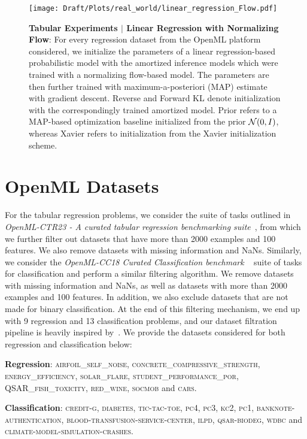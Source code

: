 \begin{figure}
    \centering
    \texttt{[image: Draft/Plots/real\_world/linear\_regression\_Flow.pdf]}
    \caption{\textbf{Tabular Experiments $|$ Linear Regression with Normalizing Flow}: For every regression dataset from the OpenML platform considered, we initialize the parameters of a linear regression-based probabilistic model with the amortized inference models which were trained with a normalizing flow-based model. The parameters are then further trained with maximum-a-posteriori (MAP) estimate with gradient descent. Reverse and Forward KL denote initialization with the correspondingly trained amortized model. Prior refers to a MAP-based optimization baseline initialized from the prior ${\mathcal{N}}(0, I)$, whereas Xavier refers to initialization from the Xavier initialization scheme.}
    \label{fig:regression_linear_flow}
\end{figure}
\section{OpenML Datasets}
\label{appdx:datasets}

For the tabular regression problems, we consider the suite of tasks outlined in \textit{OpenML-CTR23 - A curated tabular regression benchmarking suite}~\citep{fischer2023openmlctr23}, from which we further filter out datasets that have more than 2000 examples and 100 features. We also remove datasets with missing information and NaNs. Similarly, we consider the \textit{OpenML-CC18 Curated Classification benchmark
}~\citep{bischl2019openmlcc18} suite of tasks for classification and perform a similar filtering algorithm. We remove datasets with missing information and NaNs, as well as datasets with more than 2000 examples and 100 features. In addition, we also exclude datasets that are not made for binary classification. At the end of this filtering mechanism, we end up with 9 regression and 13 classification problems, and our dataset filtration pipeline is heavily inspired by~\cite{hollmann2022tabpfn}. We provide the datasets considered for both regression and classification below:

\textbf{Regression}: \textsc{airfoil\_self\_noise}, \textsc{concrete\_compressive\_strength}, \textsc{energy\_efficiency}, \textsc{solar\_flare}, \textsc{student\_performance\_por}, \textsc{QSAR\_fish\_toxicity}, \textsc{red\_wine}, \textsc{socmob} and \textsc{cars}.

\textbf{Classification}: \textsc{credit-g}, \textsc{diabetes}, \textsc{tic-tac-toe}, \textsc{pc4}, \textsc{pc3}, \textsc{kc2}, \textsc{pc1}, \textsc{banknote-authentication}, \textsc{blood-transfusion-service-center}, \textsc{ilpd}, \textsc{qsar-biodeg}, \textsc{wdbc} and \textsc{climate-model-simulation-crashes}.